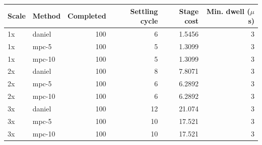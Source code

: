 \begin{tabular}{llrrrr}
\toprule
Scale & Method & Completed & Settling cycle & Stage cost & Min. dwell ($\mu$s) \\ \midrule
1x & daniel & 100 & 6 & 1.5456 & 3 \\ 
1x & mpc-5 & 100 & 5 & 1.3099 & 3 \\ 
1x & mpc-10 & 100 & 5 & 1.3099 & 3 \\ 
2x & daniel & 100 & 8 & 7.8071 & 3 \\ 
2x & mpc-5 & 100 & 6 & 6.2892 & 3 \\ 
2x & mpc-10 & 100 & 6 & 6.2892 & 3 \\ 
3x & daniel & 100 & 12 & 21.074 & 3 \\ 
3x & mpc-5 & 100 & 10 & 17.521 & 3 \\ 
3x & mpc-10 & 100 & 10 & 17.521 & 3 \\ 
\bottomrule
\end{tabular}
